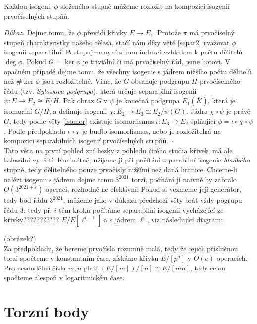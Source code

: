 \documentclass [12pt]{report}
\begin{document}
\begin{veta}
Každou isogenii $\phi$ složeného stupně můžeme rozložit na kompozici isogenií prvočíselných stupňů.
\end{veta}
\noindent \textit{Důkaz.} Dejme tomu, že  $\phi$ převádí křivky $E \longrightarrow E_1$. Protože $\pi$ má prvočíselný stupeň charakteristky našeho tělesa, stačí nám díky větě \ref{separ2} uvažovat $\phi$ isogenii separabilní. Postupujme nyní silnou indukcí vzhledem k počtu dělitelů $\deg \phi$. Pokud $G = \ker \phi$ je triviální či má prvočíselný řád, jsme hotovi. V opačném případě dejme tomu, že všechny isogenie s jádrem nižšího počtu dělitelů než $\# \ker \phi$ jsou rozložitelné. Víme, že $G$ obsahuje podgrupu $H$ prvočíselného řádu (tzv. \textit{Sylowova podgrupa}), která určuje separabilní isogenii $\psi : E \longrightarrow E_2 \cong E/H$. Pak obraz $G$ v $\psi$ je konečná podgrupa $E_1 (\overline{K})$, která je isomorfní $G/H$, a definuje isogenii $\chi : E_2 \longrightarrow E_3 \cong E_2/\psi(G)$. Jádro $\chi \circ \psi$ je právě $G$, tedy podle věty \ref{isomor} existuje isomorfismus $\iota : E_3 \longrightarrow E_2$ splňující $\phi = \iota \circ \chi \circ \psi$. Podle předpokladu $\iota \circ \chi$ je buďto isomorfismus, nebo je rozložitelná na kompozici separabilních isogenií prvočíselných stupňů. \hfill $\square$\\

Tato věta na první pohled zní hezky z pohledu čirého studia křivek, má ale kolosální využití. Konkrétně, užijeme ji při počítání separabilní isogenie \textit{hladkého} stupně, tedy dělitelného pouze prvočísly nižšími než daná hranice. Chceme-li nalézt isogenii s jádrem dejme tomu $3^{2021}$ torzí, počítání jí naivně by zabralo $O(3^{2021 + \varepsilon})$ operaci, rozhodně ne efektivní. Pokud si vezmeme její generátor, tedy bod řádu $3^{2021}$, můžeme jako v důkazu předchozí věty brát vždy pogrupu řádu $3$, tedy při $i$-tém kroku počítáme separabilní isogenii vycházející ze křivky??????????? $E/E[\ell^{i-1}]$ a s jádrem $\ell^i$, viz následující diagram:


(obrázek?)\\

Za předpokladu, že bereme prvočísla rozumně malá, tedy že jejich příslušnou torzi spočteme v konstantním čase, získáme křivku $E/[p^a]$ v $O(a)$ operacích. Pro nesoudělná čísla $m,n$ platí $(E/[m])/[n] \cong E/[mn]$, tedy celou  spočteme alespoň v logaritmickém čase.

\section{Torzní body}
\end{document}
